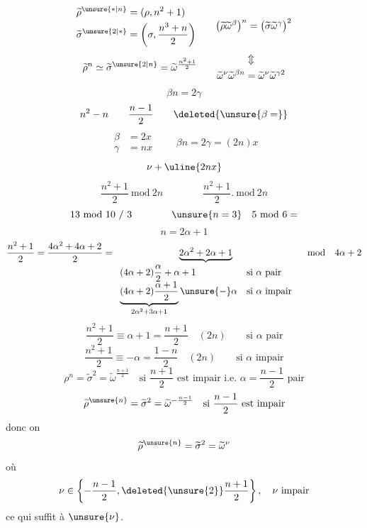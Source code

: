 \[
\begin{aligned}
\widetilde\rho^{\unsure{*|n}}&=(\rho,n^2+1)\\
\widetilde\sigma^{\unsure{2|*}}&=\left(\sigma,\frac{n^3+n}{2}\right)
\end{aligned}
\qquad
\bigl(\widetilde\rho\widetilde\omega^{\beta}\bigr)^n
=\bigl(\widetilde\sigma\widetilde\omega^{\gamma}\bigr)^2
\]
\[
\widetilde\rho^n\simeq\widetilde\sigma^{\unsure{2|n}}
=\widetilde\omega^{\frac{n^2+1}{2}}
\qquad
\begin{gathered}
\Updownarrow\\
\widetilde\omega^\nu\widetilde\omega^{\beta n}
=\widetilde\omega^\nu\widetilde\omega^{\gamma2}
\end{gathered}
\]
\[
\beta n=2\gamma
\]
\[
n^2-n\qquad\frac{n-1}{2}\qquad\deleted{\unsure{\beta=}}
\]
\[
\begin{aligned}
\beta&=2x\\
\gamma&=nx
\end{aligned}
\qquad
\beta n=2\gamma=(2n)x
\]
\[
\nu+\uline{2nx}
\]
\[
\frac{n^2+1}{2}\ \mathrm{mod}\ 2n
\qquad\qquad
\frac{n^2+1}{2}.\ \mathrm{mod}\ 2n
\]
\[
13\ \mathrm{mod}\ 10\ /\ 3
\qquad\qquad
\unsure{n=3}\quad5\ \mathrm{mod}\ 6=
\]
\[
n=2\alpha+1
\]
\[
\frac{n^2+1}{2}
=\frac{4\alpha^2+4\alpha+2}{2}
=\underbrace{2\alpha^2+2\alpha+1}_{
\begin{array}{ll}
(4\alpha+2)\dfrac{\alpha}{2}+\alpha+1&\text{si }\alpha\text{ pair}\\
\underbrace{(4\alpha+2)\dfrac{\alpha+1}{2}}_{2\alpha^2+3\alpha+1}
\unsure{-}\alpha&\text{si }\alpha\text{ impair}
\end{array}}
\quad\mathrm{mod}\quad4\alpha+2
\]
\[
\frac{n^2+1}{2}\equiv\alpha+1=\frac{n+1}{2}
\quad(2n)\qquad\text{si }\alpha\text{ pair}
\]
\[
\frac{n^2+1}{2}\equiv-\alpha=\frac{1-n}{2}
\quad(2n)\qquad\text{si }\alpha\text{ impair}
\]
\[
\rho^n=\widetilde\sigma^2=\widetilde\omega^{\frac{n+1}{2}}
\quad\text{si }\frac{n+1}{2}\text{ est impair i.e. }\alpha=\frac{n-1}{2}\text{ pair}
\]
\[
\widetilde\rho^{\unsure{n}}=\widetilde\sigma^2
=\widetilde\omega^{-\frac{n-1}{2}}
\quad\text{si }\frac{n-1}{2}\text{ est impair}
\]
donc on  
\[
\widetilde\rho^{\unsure{n}}=\widetilde\sigma^2=\widetilde\omega^\nu
\]
où
\[
\nu\in\left\{-\frac{n-1}{2},\deleted{\unsure{2}}\frac{n+1}{2}\right\},
\quad\nu\text{ impair}
\]
ce qui suffit à  $\unsure{\nu}$.

